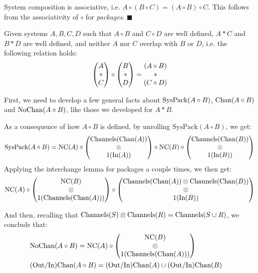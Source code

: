 \begin{lemma}
System composition is associative, i.e. $A \circ (B \circ C) = (A \circ B) \circ C$.
 This follows from the associativity of $\circ$ for \emph{packages}. $\blacksquare$
\end{lemma}

\begin{lemma}
\label{thm:interchange_system}
Given systems $A, B, C, D$ such that $A \circ B$ and $C \circ D$ are well defined,
$A * C$ and $B * D$ are well defined,
and neither $A$ nor $C$ overlap with $B$ or $D$, i.e.
the following relation holds:
$$
\begin{pmatrix} 
A\cr
*\cr
C\cr
\end{pmatrix} 
\circ
\begin{pmatrix} 
B\cr
*\cr
D\cr
\end{pmatrix} 
=
\begin{matrix} 
  (A \circ B)\cr
*\cr
  (C \circ D)\cr
\end{matrix} 
$$

First, we need to develop a few general facts about $\text{SysPack}(A \circ B)$, $\text{Chan}(A \circ B)$
and $\text{NoChan}(A \circ B)$, like those we developed for $A * B$.

As a consequence of how $A \circ B$ is defined, by unrolling $\text{SysPack}(A \circ B)$,
we get:
$$
  \text{SysPack}(A \circ B) =
  \text{NC}(A) \circ
  \begin{pmatrix}
    \text{Channels}(\text{Chan}(A))\cr
    \otimes\cr
    1(\text{In}(A))
  \end{pmatrix}
  \circ \text{NC}(B) \circ
  \begin{pmatrix}
    \text{Channels}(\text{Chan}(B))\cr
    \otimes\cr
    1(\text{In}(B))
  \end{pmatrix}
$$
Applying the interchange lemma for packages a couple times, we then get:
$$
  \text{NC}(A) \circ
  \begin{pmatrix}
    \text{NC}(B)\cr
    \otimes\cr
    1(\text{Channels}(\text{Chan}(A)))
  \end{pmatrix}
  \circ
  \begin{pmatrix}
    \text{Channels}(\text{Chan}(A)) \otimes \text{Channels}(\text{Chan}(B))\cr
    \otimes\cr
    1(\text{In}(B))
  \end{pmatrix}
$$

And then, recalling
that $\text{Channels}(S) \otimes \text{Channels}(R) = \text{Channels}(S \cup R)$,
we conclude that:
$$
\begin{aligned}
  &\text{NoChan}(A \circ B) =
  \text{NC}(A) \circ
  \begin{pmatrix}
    \text{NC}(B)\cr
    \otimes\cr
    1(\text{Channels}(\text{Chan}(A)))
  \end{pmatrix}
  \cr
  &\text{(Out/In)Chan}(A \circ B) = \text{(Out/In)Chan}(A) \cup \text{(Out/In)Chan}(B)\cr
\end{aligned}
$$


\end{lemma}
